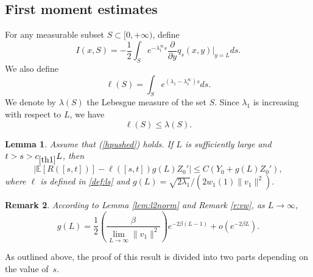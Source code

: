 \documentclass[11pt]{article}
\theoremstyle{plain}
\newtheorem{lemma}{Lemma}[section]
\newtheorem{rem}[lemma]{Remark}
\newcommand\linf{\lambda_1^\infty}
\begin{document}

 

\subsection{First moment estimates} \label{sec:fmR}

For any measurable subset $S\subset [0,+\infty)$, define 
\begin{equation*}
    I(x,S)=-\frac{1}{2}\int_{S}e^{-\linf s}\frac{\partial}{\partial y}q_s(x,y)|_{y=L}ds. 
\end{equation*}
We also define
\begin{equation}
    \ell(S)=\int_Se^{(\lambda_1-\linf)s}ds.
    \label{def:ls}
\end{equation}
We denote by $\lambda(S)$ the Lebesgue measure of the set $S$.
Since $\lambda_1$ is increasing with respect to $L$, we have 
\begin{equation}
\ell(S)\leqslant \lambda(S) \label{r:ell}.
\end{equation}
\begin{lemma} \label{th:r}Assume that (\ref{hpushed}) holds. If $L$ is sufficiently large and $t>s>c_{\ref{th1}}L$, then  \begin{equation*}
\left|\mathbb{E}[R([s,t])]-\ell([s,t])g(L)Z_0'\right|\leqslant C(Y_0+g(L)Z_0'),
\end{equation*}
where $\ell$ is defined in \eqref{def:ls} and  $g(L)= \sqrt{2\lambda_1}/(2w_1(1)\|v_1\|^2).$ 
\end{lemma}
\begin{rem}\label{rem:g}
According to Lemma \ref{lem:l2norm}  and Remark \ref{r:vw},  as $L\to\infty$,
\begin{equation*}
g(L)=\frac{1}{2}\left(\frac{\beta}{\lim\limits_{L\rightarrow\infty}\|v_1\|^2}\right)e^{-2\beta (L-1)}+o(e^{-2\beta L}).
\end{equation*}
\end{rem}
\noindent As outlined above, the proof of this result is divided into two parts depending on the value of~$s$.
\end{document}
